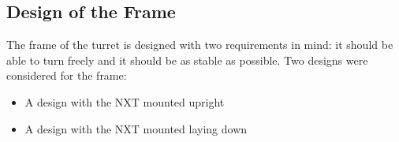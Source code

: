% 



\subsection{Design of the Frame}
The frame of the turret is designed with two requirements in mind: it should
be able to turn freely and it should be as stable as possible. Two designs were
considered for the frame:

\begin{itemize}
  \item A design with the NXT mounted upright
  \item A design with the NXT mounted laying down
\end{itemize}

